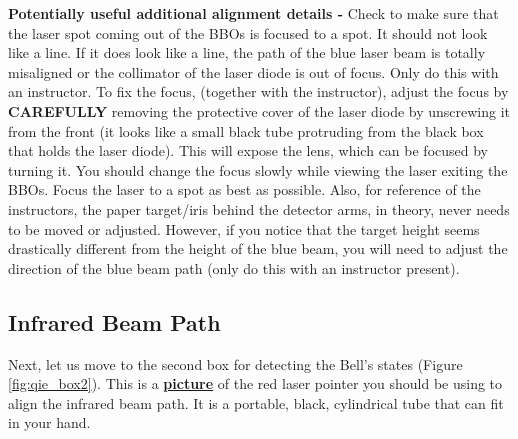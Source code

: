 \documentclass{../lab}
\begin{document}
\textbf{Potentially useful additional alignment details -} Check to make sure that the laser spot coming out of the BBOs is focused to a spot. It should not look like a line. If it does look like a line, the path of the blue laser beam is totally misaligned or the collimator of the laser diode is out of focus. Only do this with an instructor. To fix the focus, (together with the instructor), adjust the focus by \textbf{CAREFULLY} removing the protective cover of the laser diode by unscrewing it from the front (it looks like a small black tube protruding from the black box that holds the laser diode). This will expose the lens, which can be focused by turning it. You should change the focus slowly while viewing the laser exiting the BBOs. Focus the laser to a spot as best as possible. Also, for reference of the instructors, the paper target/iris behind the detector arms, in theory, never needs to be moved or adjusted. However, if you notice that the target height seems drastically different from the height of the blue beam, you will need to adjust the direction of the blue beam path (only do this with an instructor present).


\subsection{Infrared Beam Path}

Next, let us move to the second box for detecting the Bell's states (Figure \ref{fig:qie_box2}). This is a \href{https://berkeley-physics111b.github.io/assets/pdf/oldwebsitestructure/QIE/laser.JPG}{\textbf{picture}} of the red laser pointer you should be using to align the infrared beam path. It is a portable, black, cylindrical tube that can fit in your hand.
\end{document}
